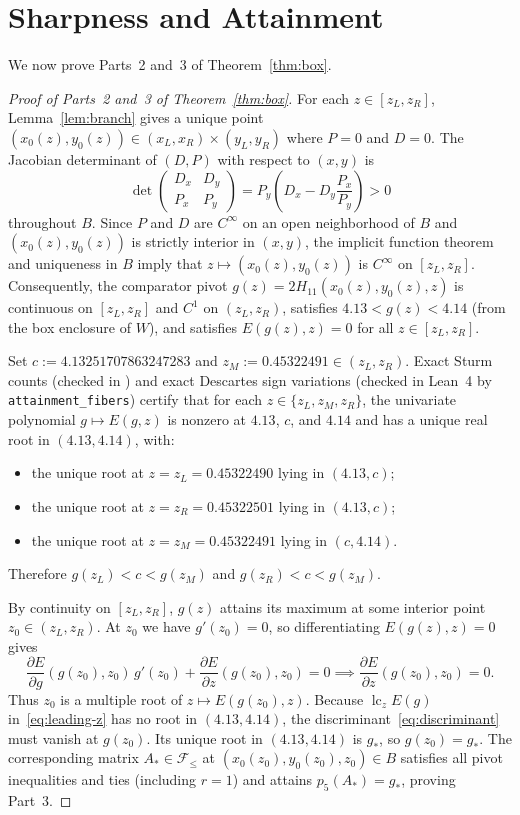 \documentclass[11pt]{article}
\theoremstyle{remark}
\begin{document}
\section{Sharpness and Attainment}\label{sec:sharpness}

We now prove Parts~2 and~3 of Theorem~\ref{thm:box}.

\begin{proof}[Proof of Parts~2 and~3 of Theorem~\ref{thm:box}]
For each $z\in[z_L,z_R]$, Lemma~\ref{lem:branch} gives a unique point
$(x_0(z),y_0(z))\in(x_L,x_R)\times(y_L,y_R)$ where $P=0$ and $D=0$. The
Jacobian determinant of $(D,P)$ with respect to $(x,y)$ is
\[
  \det\begin{pmatrix} D_x & D_y \\ P_x & P_y \end{pmatrix}
  = P_y\left(D_x - D_y\frac{P_x}{P_y}\right) > 0
\]
throughout $B$. Since $P$ and $D$ are $C^\infty$ on an open neighborhood of
$B$ and $(x_0(z),y_0(z))$ is strictly interior in $(x,y)$, the implicit
function theorem and uniqueness in $B$ imply that $z\mapsto (x_0(z),y_0(z))$
is $C^\infty$ on $[z_L,z_R]$. Consequently, the comparator pivot
$g(z)=2H_{11}(x_0(z),y_0(z),z)$ is continuous on $[z_L,z_R]$ and $C^1$ on
$(z_L,z_R)$, satisfies $4.13 < g(z) < 4.14$ (from the box enclosure of $W$),
and satisfies $E(g(z),z)=0$ for all $z\in[z_L,z_R]$.

Set $c := 4.13251707863247283$ and $z_M := 0.45322491 \in (z_L,z_R)$. Exact
Sturm counts (checked in ) and exact
Descartes sign variations (checked in Lean~4 by \texttt{attainment\_fibers})
certify that for each $z\in\{z_L,z_M,z_R\}$, the univariate polynomial
$g\mapsto E(g,z)$ is nonzero at $4.13$, $c$, and $4.14$ and has a unique real
root in $(4.13,4.14)$, with:
\begin{itemize}
  \item the unique root at $z=z_L=0.45322490$ lying in $(4.13,c)$;
  \item the unique root at $z=z_R=0.45322501$ lying in $(4.13,c)$;
  \item the unique root at $z=z_M=0.45322491$ lying in $(c,4.14)$.
\end{itemize}
Therefore $g(z_L) < c < g(z_M)$ and $g(z_R) < c < g(z_M)$.

By continuity on $[z_L,z_R]$, $g(z)$ attains its maximum at some interior
point $z_0\in(z_L,z_R)$. At $z_0$ we have $g'(z_0)=0$, so differentiating
$E(g(z),z)=0$ gives
\[
  \frac{\partial E}{\partial g}(g(z_0),z_0)\,g'(z_0)
  + \frac{\partial E}{\partial z}(g(z_0),z_0) = 0
  \implies \frac{\partial E}{\partial z}(g(z_0),z_0) = 0.
\]
Thus $z_0$ is a multiple root of $z\mapsto E(g(z_0),z)$. Because
$\operatorname{lc}_z E(g)$ in~\eqref{eq:leading-z} has no root in
$(4.13,4.14)$, the discriminant~\eqref{eq:discriminant} must vanish at
$g(z_0)$. Its unique root in $(4.13,4.14)$ is $g_*$, so $g(z_0)=g_*$. The
corresponding matrix $A_*\in\mathcal{F}_{\le}$ at $(x_0(z_0),y_0(z_0),z_0)\in B$
satisfies all pivot inequalities and ties (including $r=1$) and attains
$p_5(A_*)=g_*$, proving Part~3.


\end{proof}
\end{document}

